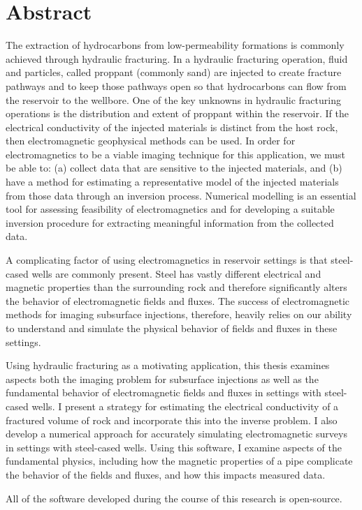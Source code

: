 
\chapter{Abstract}

The extraction of hydrocarbons from low-permeability formations is commonly achieved through hydraulic fracturing. In a hydraulic fracturing operation, fluid and particles, called proppant (commonly sand) are injected to create fracture pathways and to keep those pathways open so that hydrocarbons can flow from the reservoir to the wellbore. One of the key unknowns in hydraulic fracturing operations is the distribution and extent of proppant within the reservoir. If the electrical conductivity of the injected materials is distinct from the host rock, then electromagnetic geophysical methods can be used. In order for electromagnetics to be a viable imaging technique for this application, we must be able to: (a) collect data that are sensitive to the injected materials, and (b) have a method for estimating a representative model of the injected materials from those data through an inversion process. Numerical modelling is an essential tool for assessing feasibility of electromagnetics and for developing a suitable inversion procedure for extracting meaningful information from the collected data.

A complicating factor of using electromagnetics in reservoir settings is that steel-cased wells are commonly present. Steel has vastly different electrical and magnetic properties than the surrounding rock and therefore significantly alters the behavior of electromagnetic fields and fluxes. The success of electromagnetic methods for imaging subsurface injections, therefore, heavily relies on our ability to understand and simulate the physical behavior of fields and fluxes in these settings.

Using hydraulic fracturing as a motivating application, this thesis examines aspects both the imaging problem for subsurface injections as well as the fundamental behavior of electromagnetic fields and fluxes in settings with steel-cased wells. I present a strategy for estimating the electrical conductivity of a fractured volume of rock and incorporate this into the inverse problem. I also develop a numerical approach for accurately simulating electromagnetic surveys in settings with steel-cased wells. Using this software, I examine aspects of the fundamental physics, including how the magnetic properties of a pipe complicate the behavior of the fields and fluxes, and how this impacts measured data.

All of the software developed during the course of this research is open-source.

\vfill
\begin{center}
\begin{sf}
\end{sf}
\end{center}
